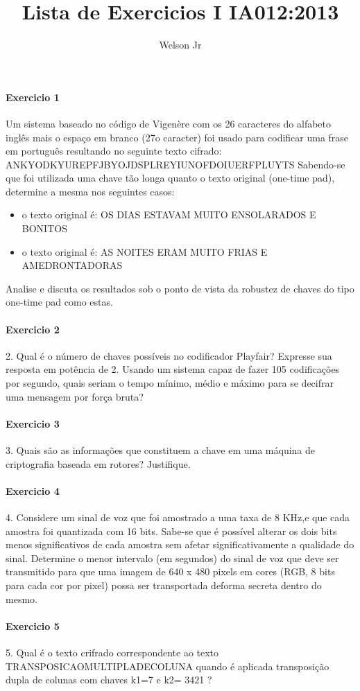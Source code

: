 \documentclass[10pt,a4paper]{report}
\author{Welson Jr}
\title{Lista de Exercicios I IA012:2013}
\begin{document}
\paragraph{Exercicio 1}
Um sistema baseado no código de Vigenère com os 26 caracteres do alfabeto inglês mais o espaço em branco (27o caracter) foi usado para codificar uma frase em português resultando no seguinte texto cifrado:
{\quote ANKYODKYUREPFJBYOJDSPLREYIUNOFDOIUERFPLUYTS}
Sabendo-se que foi utilizada uma chave tão longa quanto o texto original (one-time pad), determine a mesma nos seguintes casos:
\begin{itemize}
\item o texto original é: OS DIAS ESTAVAM MUITO ENSOLARADOS E BONITOS
\item o texto original é: AS NOITES ERAM MUITO FRIAS E AMEDRONTADORAS
\end{itemize}
 Analise e discuta os resultados sob o ponto de vista da robustez de chaves do tipo one-time pad como estas.
\paragraph{Exercicio 2}
2. Qual é o número de chaves possíveis no codificador Playfair? Expresse sua resposta em potência de 2. Usando um sistema capaz de fazer 105 codificações por segundo, quais seriam o tempo mínimo, médio e máximo para se decifrar uma mensagem por força bruta?
\paragraph{Exercicio 3}
3. Quais são as informações que constituem a chave em uma máquina de criptografia baseada em rotores? Justifique.
\paragraph{Exercicio 4}
4. Considere um sinal de voz que foi amostrado a uma taxa de 8 KHz,e que cada amostra foi quantizada com 16 bits. Sabe-se que é possível alterar os dois bits menos significativos de cada amostra sem afetar significativamente a qualidade do sinal. Determine o menor intervalo (em segundos) do sinal de voz que deve ser transmitido para que uma imagem de 640 x 480 pixels em cores (RGB, 8 bits para cada cor por pixel) possa ser transportada deforma secreta dentro do mesmo.
\paragraph{Exercicio 5}
5. Qual é o texto crifrado correspondente ao texto
TRANSPOSICAOMULTIPLADECOLUNA
quando é aplicada transposição dupla de colunas com chaves k1=7 e k2= 3421 ?
\end{document}
